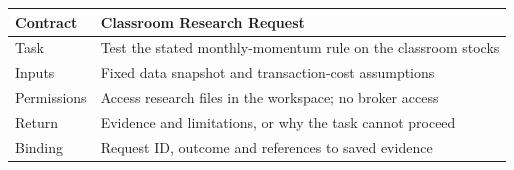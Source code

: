 \begin{tabular}{@{}P{3.0cm}P{9.5cm}@{}}
\toprule
\textbf{Contract} & \textbf{Classroom Research Request} \\
\midrule
Task & Test the stated monthly-momentum rule on the classroom stocks \\
Inputs & Fixed data snapshot and transaction-cost assumptions \\
Permissions & Access research files in the workspace; no broker access \\
Return & Evidence and limitations, or why the task cannot proceed \\
Binding & Request ID, outcome and references to saved evidence \\
\bottomrule
\end{tabular}
